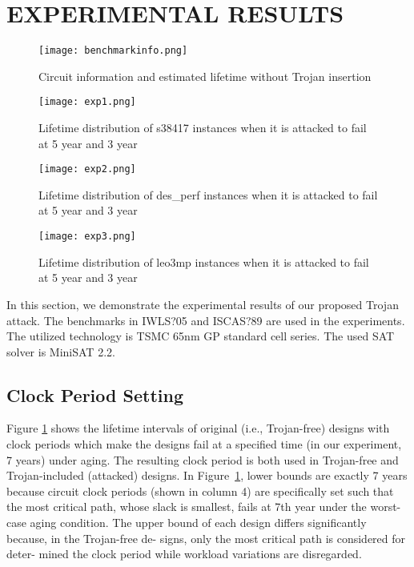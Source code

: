 \section{EXPERIMENTAL RESULTS}
\label{sec:mot}
\begin{figure}
	\centering
	\texttt{[image: benchmarkinfo.png]}
	\caption{Circuit information and estimated lifetime without Trojan insertion}
	\label{fig:benchmark}
\end{figure}
\begin{figure}
	\centering
	\texttt{[image: exp1.png]}
	\caption{Lifetime distribution of s38417 instances when it is attacked to fail at 5 year and 3 year}
	\label{fig:exp1}
\end{figure}
\begin{figure}
	\centering
	\texttt{[image: exp2.png]}
	\caption{Lifetime distribution of des\_perf instances when it is attacked to fail at 5 year and 3 year}
	\label{fig:exp2}
\end{figure}
\begin{figure}
	\centering
	\texttt{[image: exp3.png]}
	\caption{Lifetime distribution of leo3mp instances when it is attacked to fail at 5 year and 3 year}
	\label{fig:exp3}
\end{figure}

In this section, we demonstrate the experimental results of our proposed Trojan attack. The benchmarks in IWLS?05 and ISCAS?89 are used in the experiments. The utilized technology is TSMC 65nm GP standard cell series. The used SAT solver is MiniSAT 2.2.

\subsection{Clock Period Setting}
Figure \ref{fig:benchmark} shows the lifetime intervals of original (i.e., Trojan-free) designs with clock periods which make the designs fail at a specified time (in our experiment, 7 years) under aging. The resulting clock period is both used in Trojan-free and Trojan-included (attacked) designs. In Figure~\ref{fig:benchmark}, lower bounds are exactly 7 years because circuit clock periods (shown in column 4) are specifically set such that the most critical path, whose slack is smallest, fails at 7th year under the worst-case aging condition. The upper bound of each design differs significantly because, in the Trojan-free de- signs, only the most critical path is considered for deter- mined the clock period while workload variations are disregarded.

